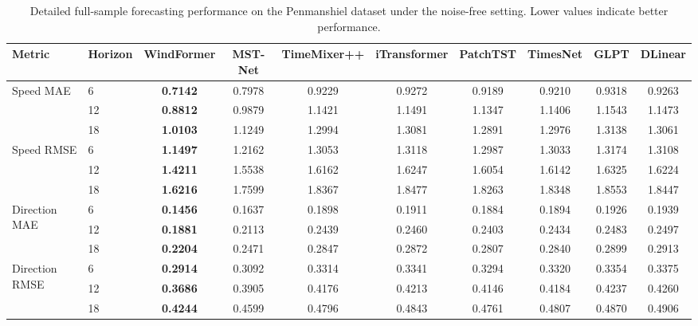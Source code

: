\begin{table}[htbp]
\caption{Detailed full-sample forecasting performance on the Penmanshiel dataset under the noise-free setting. Lower values indicate better performance.}
\label{tab:main_penmanshiel}
\centering
\scriptsize
\setlength{\tabcolsep}{5pt}
\renewcommand{\arraystretch}{1.04}
\begin{adjustbox}{max width=\textwidth}
\begin{tabular}{llcccccccc}
\toprule
Metric & Horizon & WindFormer & MST-Net & TimeMixer++ & iTransformer & PatchTST & TimesNet & GLPT & DLinear \\
\midrule
\multirow{3}{*}{Speed MAE} & 6 & \textbf{0.7142} & 0.7978 & 0.9229 & 0.9272 & 0.9189 & 0.9210 & 0.9318 & 0.9263 \\
& 12 & \textbf{0.8812} & 0.9879 & 1.1421 & 1.1491 & 1.1347 & 1.1406 & 1.1543 & 1.1473 \\
& 18 & \textbf{1.0103} & 1.1249 & 1.2994 & 1.3081 & 1.2891 & 1.2976 & 1.3138 & 1.3061 \\
\midrule
\multirow{3}{*}{Speed RMSE} & 6 & \textbf{1.1497} & 1.2162 & 1.3053 & 1.3118 & 1.2987 & 1.3033 & 1.3174 & 1.3108 \\
& 12 & \textbf{1.4211} & 1.5538 & 1.6162 & 1.6247 & 1.6054 & 1.6142 & 1.6325 & 1.6224 \\
& 18 & \textbf{1.6216} & 1.7599 & 1.8367 & 1.8477 & 1.8263 & 1.8348 & 1.8553 & 1.8447 \\
\midrule
\multirow{3}{*}{Direction MAE} & 6 & \textbf{0.1456} & 0.1637 & 0.1898 & 0.1911 & 0.1884 & 0.1894 & 0.1926 & 0.1939 \\
& 12 & \textbf{0.1881} & 0.2113 & 0.2439 & 0.2460 & 0.2403 & 0.2434 & 0.2483 & 0.2497 \\
& 18 & \textbf{0.2204} & 0.2471 & 0.2847 & 0.2872 & 0.2807 & 0.2840 & 0.2899 & 0.2913 \\
\midrule
\multirow{3}{*}{Direction RMSE} & 6 & \textbf{0.2914} & 0.3092 & 0.3314 & 0.3341 & 0.3294 & 0.3320 & 0.3354 & 0.3375 \\
& 12 & \textbf{0.3686} & 0.3905 & 0.4176 & 0.4213 & 0.4146 & 0.4184 & 0.4237 & 0.4260 \\
& 18 & \textbf{0.4244} & 0.4599 & 0.4796 & 0.4843 & 0.4761 & 0.4807 & 0.4870 & 0.4906 \\
\bottomrule
\end{tabular}
\end{adjustbox}
\end{table}

